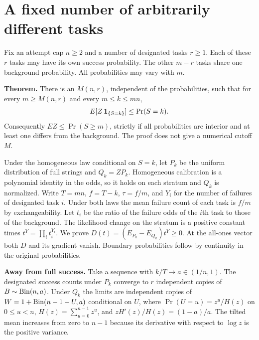 \section*{A fixed number of arbitrarily different tasks}

Fix an attempt cap $n\ge2$ and a number of designated tasks $r\ge1$. Each of these $r$ tasks may have its own success probability. The other $m-r$ tasks share one background probability. All probabilities may vary with $m$.

\textbf{Theorem.} There is an $M(n,r)$, independent of the probabilities, such that for every $m\ge M(n,r)$ and every $m\le k\le mn$,
\[
 E[Z\,{\bf1}_{\{S=k\}}]\le \Pr(S=k).
\]
Consequently $EZ\le\Pr(S\ge m)$, strictly if all probabilities are interior and at least one differs from the background. The proof does not give a numerical cutoff $M$.

Under the homogeneous law conditional on $S=k$, let $P_k$ be the uniform distribution of full strings and $Q_k=ZP_k$. Homogeneous calibration is a polynomial identity in the odds, so it holds on each stratum and $Q_k$ is normalized. Write $T=mn$, $f=T-k$, $\tau=f/m$, and $Y_i$ for the number of failures of designated task $i$. Under both laws the mean failure count of each task is $f/m$ by exchangeability. Let $t_i$ be the ratio of the failure odds of the $i$th task to those of the background. The likelihood change on the stratum is a positive constant times $t^Y=\prod_i t_i^{Y_i}$. We prove $D(t)=(E_{P_k}-E_{Q_k})t^Y\ge0$. At the all-ones vector both $D$ and its gradient vanish. Boundary probabilities follow by continuity in the original probabilities.

\textbf{Away from full success.} Take a sequence with $k/T\to a\in(1/n,1)$. The designated success counts under $P_k$ converge to $r$ independent copies of $B\sim{\rm Bin}(n,a)$. Under $Q_k$ the limits are independent copies of $W=1+{\rm Bin}(n-1-U,a)$ conditional on $U$, where $\Pr(U=u)=z^u/H(z)$ on $0\le u<n$, $H(z)=\sum_{u=0}^{n-1}z^u$, and $zH'(z)/H(z)=(1-a)/a$. The tilted mean increases from zero to $n-1$ because its derivative with respect to $\log z$ is the positive variance.


